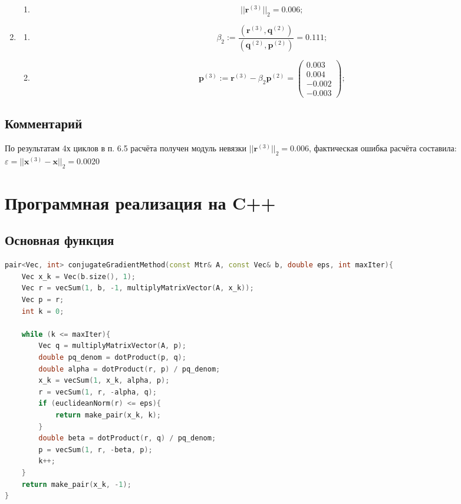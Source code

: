 \begin{enumerate}
\begin{enumerate}
        \item $$||\mathbf{r}^{(3)}||_2 = \mathbf{0.006};$$
   \end{enumerate}

    \item \begin{enumerate}
        \item $$\beta_2 :=
            \dfrac{(\mathbf{r}^{(3)}, \mathbf{q}^{(2)})}{(\mathbf{q}^{(2)}, \mathbf{p}^{(2)})} = 0.111;$$

        \item $$\mathbf{p}^{(3)} :=
            \mathbf{r}^{(3)}-\beta_2\mathbf{p}^{(2)} = \begin{pmatrix} 0.003\\0.004\\-0.002\\-0.003 \end{pmatrix};$$
    \end{enumerate}
\end{enumerate}

\subsection{Комментарий}
По результатам 4х циклов в п. 6.5 расчёта получен модуль невязки $||\mathbf{r}^{(3)}||_2 = \mathbf{0.006}$, фактическая ошибка расчёта составила: $\varepsilon = ||\mathbf{x}^{(3)} - \mathbf{x}||_2 = \mathbf{0.0020}$

\clearpage
\section{Программная реализация на C++}
\subsection{Основная функция}
\begin{lstlisting}[language=c++]
pair<Vec, int> conjugateGradientMethod(const Mtr& A, const Vec& b, double eps, int maxIter){
    Vec x_k = Vec(b.size(), 1);
    Vec r = vecSum(1, b, -1, multiplyMatrixVector(A, x_k));
    Vec p = r;
    int k = 0;

    while (k <= maxIter){
        Vec q = multiplyMatrixVector(A, p);
        double pq_denom = dotProduct(p, q);
        double alpha = dotProduct(r, p) / pq_denom;
        x_k = vecSum(1, x_k, alpha, p);
        r = vecSum(1, r, -alpha, q);
        if (euclideanNorm(r) <= eps){
            return make_pair(x_k, k);
        }
        double beta = dotProduct(r, q) / pq_denom;
        p = vecSum(1, r, -beta, p);
        k++;
    }
    return make_pair(x_k, -1);
}
\end{lstlisting}
